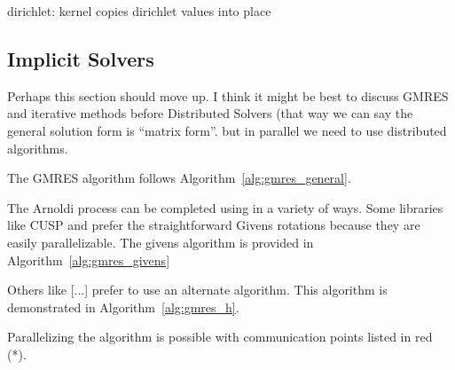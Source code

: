 
dirichlet: kernel copies dirichlet values into place 





 

\subsection{Implicit Solvers}

Perhaps this section should move up. I think it might be best to discuss GMRES and iterative methods before Distributed Solvers (that way we can say the general solution form is ``matrix form''. but in parallel we need to use distributed algorithms.

The GMRES algorithm follows Algorithm~\ref{alg:gmres_general}. 

The Arnoldi process can be completed using in a variety of ways. Some libraries like CUSP and \cite{Saad2003} prefer the straightforward Givens rotations because they are easily parallelizable. The givens algorithm is provided in Algorithm~\ref{alg:gmres_givens}

Others like [...] prefer to use an alternate algorithm. This algorithm is demonstrated in Algorithm~\ref{alg:gmres_h}.

Parallelizing the algorithm is possible with communication points listed in red (*). 





